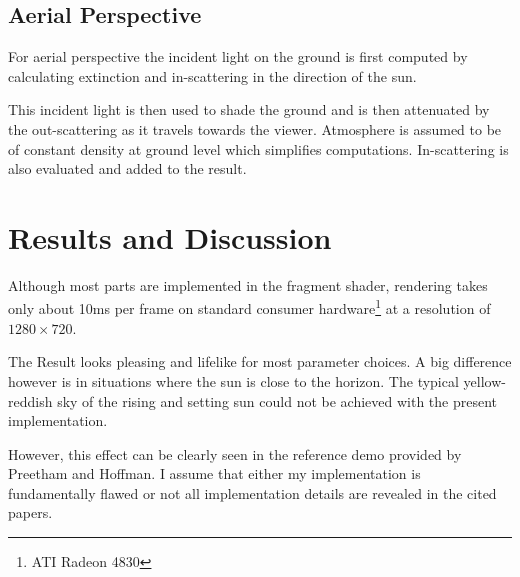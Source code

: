 \documentclass[12pt,a4paper]{scrartcl}
\begin{document}
\subsection{Aerial Perspective}
For aerial perspective the incident light on the ground is first computed by calculating extinction and in-scattering in the direction of the sun. 

This incident light is then used to shade the ground and is then attenuated by the out-scattering as it travels towards the viewer. Atmosphere is assumed to be of constant density at ground level which simplifies computations. In-scattering is also evaluated and added to the result.



\section{Results and Discussion}
Although most parts are implemented in the fragment shader, rendering takes only about 10ms per frame on standard consumer hardware\footnote{ATI Radeon 4830} at a resolution of $1280 \times 720$. 

The Result looks pleasing and lifelike for most parameter choices. A big difference however is in situations where the sun is close to the horizon. The typical yellow-reddish sky of the rising and setting sun could not be achieved with the present implementation. 

However, this effect can be clearly seen in the reference demo provided by Preetham and Hoffman. I assume that either my implementation is fundamentally flawed or not all implementation details are revealed in the cited papers.

\begin{figure}[hbtp]
\centering
{}

\end{figure}






\end{document}
